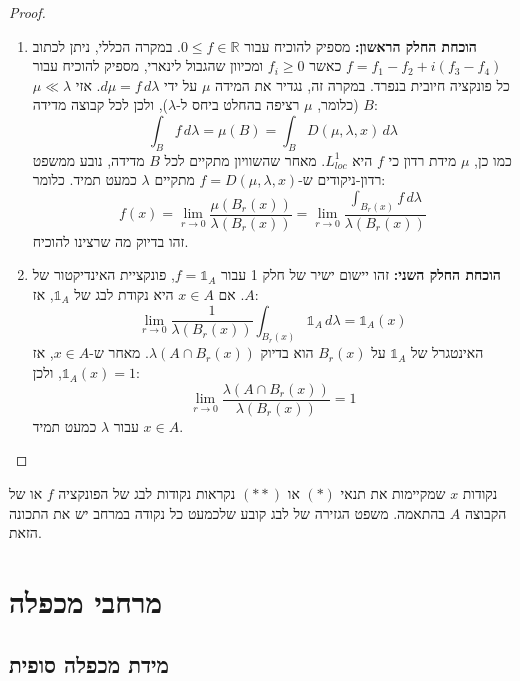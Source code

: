 \documentclass{tstextbook}
\begin{document}
\begin{proof}
  \begin{enumerate}
    \item \textbf{הוכחת החלק הראשון:} 
מספיק להוכיח עבור \(0 \leq f \in \mathbb{R}\). במקרה הכללי, ניתן לכתוב \(f = f_1 - f_2 + i(f_3 - f_4)\) כאשר \(f_i \geq 0\) ומכיוון שהגבול לינארי, מספיק להוכיח עבור כל פונקציה חיובית בנפרד.
במקרה זה, נגדיר את המידה \(\mu\) על ידי \(d\mu = f \, d\lambda\). אזי \(\mu \ll \lambda\) (כלומר, \(\mu\) רציפה בהחלט ביחס ל-\(\lambda\)), ולכן לכל קבוצה מדידה \(B\):
$$ \int_B f \, d\lambda = \mu(B) = \int_B D(\mu, \lambda, x) \, d\lambda $$
כמו כן, \(\mu\) מידת רדון כי \(f\) היא \(L^1_{loc}\).
מאחר שהשוויון מתקיים לכל \(B\) מדידה, נובע ממשפט רדון-ניקודים ש-\(f = D(\mu, \lambda, x)\) מתקיים \(\lambda\) כמעט תמיד. כלומר:
$$ f(x) = \lim_{r \to 0} \frac{\mu(B_r(x))}{\lambda(B_r(x))} = \lim_{r \to 0} \frac{\int_{B_r(x)} f \, d\lambda}{\lambda(B_r(x))} $$
זהו בדיוק מה שרצינו להוכיח.


    \item \textbf{הוכחת החלק השני:} 
זהו יישום ישיר של חלק 1 עבור \(f = \mathbb{1}_A\), פונקציית האינדיקטור של \(A\). אם \(x \in A\) היא נקודת לבג של \(\mathbb{1}_A\), אז:
$$ \lim_{r \to 0} \frac{1}{\lambda(B_r(x))} \int_{B_r(x)} \mathbb{1}_A \, d\lambda = \mathbb{1}_A(x) $$
האינטגרל של \(\mathbb{1}_A\) על \(B_r(x)\) הוא בדיוק \(\lambda(A \cap B_r(x))\). מאחר ש-\(x \in A\), אז \(\mathbb{1}_A(x) = 1\), ולכן:
$$ \lim_{r \to 0} \frac{\lambda(A \cap B_r(x))}{\lambda(B_r(x))} = 1 $$
עבור \(\lambda\) כמעט תמיד \(x \in A\).


  \end{enumerate}
\end{proof}
\begin{remark}
נקודות \(x\) שמקיימות את תנאי \((*)\) או \((**)\) נקראות נקודות לבג של הפונקציה \(f\) או של הקבוצה \(A\) בהתאמה. משפט הגזירה של לבג קובע שלכמעט כל נקודה במרחב יש את התכונה הזאת.

\end{remark}
\chapter{מרחבי מכפלה}

\section{מידת מכפלה סופית}
\end{document}
